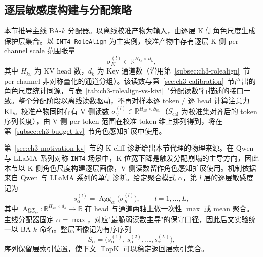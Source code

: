 \subsection{逐层敏感度构建与分配策略}
\label{subsec:ch3-baseline-bak}

本节推导主线 BA-$k$ 分配器。以离线校准产物为输入，由逐层 K 侧角色尺度生成保护层集合。以 \texttt{INT4-RoleAlign} 为主实例，校准产物中存有逐层 K 侧 per-channel scale 范围张量
\begin{equation}
\sigma_K^{(l)}\in\mathbb{R}^{H_{kv}\times d_k},
\end{equation}
其中 $H_{kv}$ 为 KV head 数，$d_k$ 为 Key 通道数（沿用第~\ref{subsec:ch3-rolealign}~节 per-channel 非对称量化的通道分组）。该读数与第~\ref{sec:ch3-calibration}~节产出的角色尺度统计同源，与表~\ref{tab:ch3-rolealign-vs-kivi}~"分配读数"行描述的接口一致。整个分配阶段以离线读数驱动，不再对样本逐 token / 逐 head 计算注意力 KL。校准产物同时存有 V 侧读数 $\sigma_V^{(l)}\in\mathbb{R}^{H_{kv}\times S_{\mathrm{cal}}}$（$S_{\mathrm{cal}}$ 为校准集对齐后的 token 序列长度），由 V 侧 per-token 范围在校准 token 维上排列得到，将在第~\ref{subsec:ch3-budget-kv}~节角色感知扩展中使用。

第~\ref{sec:ch3-motivation-kv}~节的 K-cliff 诊断给出本节代理的物理来源。在 Qwen 与 LLaMA 系列对称 \texttt{INT4} 场景中，K 位宽下降是触发分配崩塌的主导方向，因此本节以 K 侧角色尺度构建逐层画像，V 侧读数留作角色感知扩展使用。机制依据来自 Qwen 与 LLaMA 系列的单侧诊断。给定聚合模式 $\alpha$，第 $l$ 层的逐层敏感度记为
\begin{equation}
s_{\alpha}^{(l)}
=
\operatorname{Agg}_{\alpha}\!\bigl(\sigma_K^{(l)}\bigr),
\qquad l=1,\dots,L,
\end{equation}
其中 $\operatorname{Agg}_\alpha:\mathbb{R}^{H_{kv}\times d_k}\to\mathbb{R}$ 在 head 与通道两轴上做一次性 $\max$ 或 $\mathrm{mean}$ 聚合。主线分配器固定 $\alpha=\max$，对应"最脆弱读数主导"的保守口径，因此后文实验统一以 BA-$k$ 命名。整层画像记为有序序列
\begin{equation}
S_{\alpha}
=
\bigl(s_{\alpha}^{(1)},\,s_{\alpha}^{(2)},\dots,s_{\alpha}^{(L)}\bigr),
\end{equation}
序列保留层索引位置，使下文 $\operatorname{TopK}$ 可以稳定返回层索引集合。

